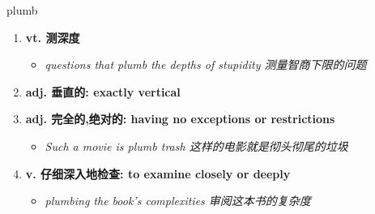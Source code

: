 
\begin{frame}
{\huge plumb}
\begin{center}
\begin{enumerate}\Large
  \item \textbf{vt. 测深度}
  \begin{itemize}
    \item \em{\Large{questions that plumb the depths of stupidity 测量智商下限的问题}}
  \end{itemize}
  \item \textbf{adj. 垂直的: exactly vertical}
  \item \textbf{adj. 完全的,绝对的: having no exceptions or restrictions}
  \begin{itemize}
    \item \em{\Large{Such a movie is plumb trash 这样的电影就是彻头彻尾的垃圾}}
  \end{itemize}
  \item \textbf{v. 仔细深入地检查: to examine closely or deeply}
  \begin{itemize}
    \item \em{\Large{plumbing the book's complexities 审阅这本书的复杂度}}
  \end{itemize}
\end{enumerate}
\end{center}
\end{frame}
